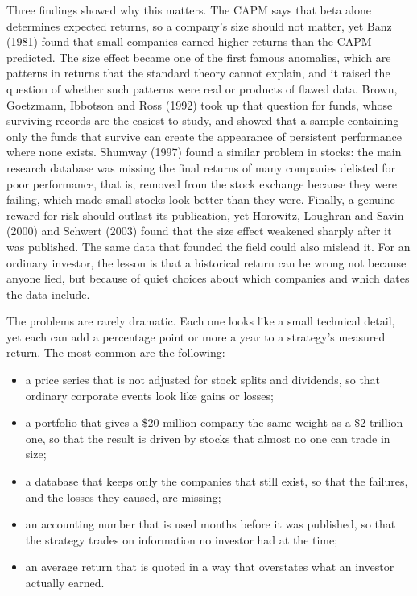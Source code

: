 Three findings showed why this matters. The CAPM says that beta alone determines expected returns, so a company's size should not matter, yet Banz (1981) found that small companies earned higher returns than the CAPM predicted. The size effect became one of the first famous anomalies, which are patterns in returns that the standard theory cannot explain, and it raised the question of whether such patterns were real or products of flawed data. Brown, Goetzmann, Ibbotson and Ross (1992) took up that question for funds, whose surviving records are the easiest to study, and showed that a sample containing only the funds that survive can create the appearance of persistent performance where none exists. Shumway (1997) found a similar problem in stocks: the main research database was missing the final returns of many companies delisted for poor performance, that is, removed from the stock exchange because they were failing, which made small stocks look better than they were. Finally, a genuine reward for risk should outlast its publication, yet Horowitz, Loughran and Savin (2000) and Schwert (2003) found that the size effect weakened sharply after it was published. The same data that founded the field could also mislead it. For an ordinary investor, the lesson is that a historical return can be wrong not because anyone lied, but because of quiet choices about which companies and which dates the data include.

The problems are rarely dramatic. Each one looks like a small technical detail, yet each can add a percentage point or more a year to a strategy's measured return. The most common are the following:

\begin{itemize}
  \item a price series that is not adjusted for stock splits and dividends, so that ordinary corporate events look like gains or losses;
  \item a portfolio that gives a \$20 million company the same weight as a \$2 trillion one, so that the result is driven by stocks that almost no one can trade in size;
  \item a database that keeps only the companies that still exist, so that the failures, and the losses they caused, are missing;
  \item an accounting number that is used months before it was published, so that the strategy trades on information no investor had at the time;
  \item an average return that is quoted in a way that overstates what an investor actually earned.
\end{itemize}

